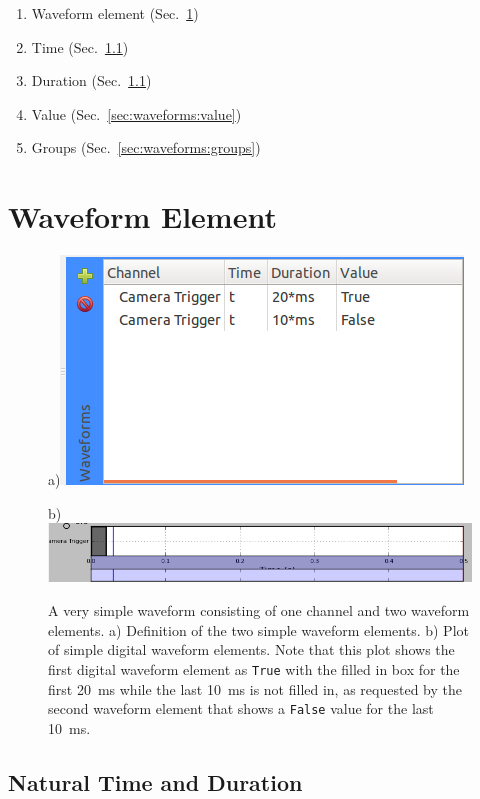 \begin{enumerate}
  \item Waveform element (Sec.~\ref{sec:waveforms:elements})
  \item Time (Sec.~\ref{sec:waveforms:nattime})
  \item Duration (Sec.~\ref{sec:waveforms:nattime})
  \item Value (Sec.~\ref{sec:waveforms:value})
  \item Groups (Sec.~\ref{sec:waveforms:groups})
\end{enumerate}


\section{Waveform Element}\label{sec:waveforms:elements}

\begin{figure}[ht]
  \centerline{a)\includegraphics[width=.5\textwidth]{figures/waveform-0}}
  \centerline{b)\includegraphics[width=.8\textwidth]{figures/plot-0}}
  \caption[Very simple waveform]{
    A very simple waveform consisting of one channel and two waveform elements.
    a) Definition of the two simple waveform elements.
    b) Plot of simple digital waveform elements.  Note that this plot shows the first
    digital waveform element as \texttt{True} with the filled in box for the
    first 20~ms while the last 10~ms is not filled in, as requested by the
    second waveform element that shows a \texttt{False} value for the last
    10~ms.
  }
  \label{fig:quick:waveform-0}
\end{figure}


\subsection{Natural Time and Duration}\label{sec:waveforms:nattime}

